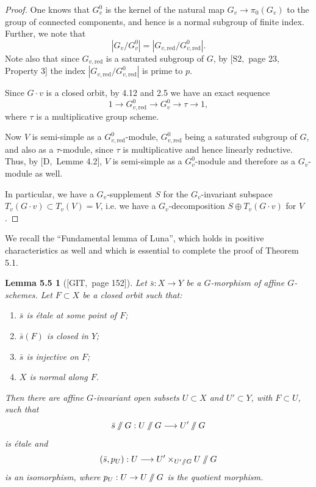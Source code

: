 \documentclass[11pt]{article}
\newcommand{\red}{\mathrm{red}}
\providecommand{\sslash}{\mathbin{/\mkern-6mu/}}
\newtheorem*{lemma55}{Lemma 5.5}
\begin{document}
\begin{proof}
One knows that \(G_v^0\) is the kernel of the natural map \(G_v\to\pi_0(G_v)\) to the
group of connected components, and hence is a normal subgroup of finite index. Further,
we note that
\[
  |G_v/G_v^0|=|G_{v,\red}/G_{v,\red}^0|.
\]
Note also that since \(G_{v,\red}\) is a saturated subgroup of \(G\), by
\([\mathrm{S2},\) page 23, Property 3] the index \(|G_{v,\red}/G_{v,\red}^0|\) is prime
to \(p\).

Since \(G\cdot v\) is a closed orbit, by 4.12 and 2.5 we have an exact sequence
\begin{equation}
  1\longrightarrow G_{v,\red}^0\longrightarrow G_v^0\longrightarrow \tau\longrightarrow 1,
  \tag{5.4.1}
\end{equation}
where \(\tau\) is a multiplicative group scheme.

Now \(V\) is semi-simple as a \(G_{v,\red}^0\)-module, \(G_{v,\red}^0\) being a
saturated subgroup of \(G\), and also as a \(\tau\)-module, since \(\tau\) is
multiplicative and hence linearly reductive. Thus, by \([\mathrm D,\) Lemme 4.2],
\(V\) is semi-simple as a \(G_v^0\)-module and therefore as a \(G_v\)-module as well.

In particular, we have a \(G_v\)-supplement \(S\) for the \(G_v\)-invariant subspace
\(T_v(G\cdot v)\subset T_v(V)=V\), i.e. we have a \(G_v\)-decomposition
\(S\oplus T_v(G\cdot v)\) for \(V\).
\end{proof}

We recall the ``Fundamental lemma of Luna'', which holds in positive characteristics as
well and which is essential to complete the proof of Theorem 5.1.

\begin{lemma55}[{\([\mathrm{GIT},\) page 152]}]
Let \(\bar s:X\to Y\) be a \(G\)-morphism of affine \(G\)-schemes. Let \(F\subset X\)
be a closed orbit such that:
\begin{enumerate}[label=(\arabic*)]
\item \(\bar s\) is étale at some point of \(F\);
\item \(\bar s(F)\) is closed in \(Y\);
\item \(\bar s\) is injective on \(F\);
\item \(X\) is normal along \(F\).
\end{enumerate}
Then there are affine \(G\)-invariant open subsets \(U\subset X\) and \(U'\subset Y\),
with \(F\subset U\), such that
\[
  \bar s\sslash G:U\sslash G\longrightarrow U'\sslash G
\]
is étale and
\[
  (\bar s,p_U):U\longrightarrow U'\times_{U'\sslash G}U\sslash G
\]
is an isomorphism, where \(p_U:U\to U\sslash G\) is the quotient morphism.
\end{lemma55}
\end{document}
